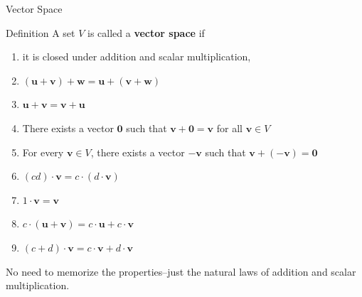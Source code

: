 \documentclass{beamer}
\begin{document}
\begin{frame}{Vector Space}
  \begin{block}{Definition}
    A set $V$ is called a \textbf{vector space} if
    \begin{enumerate}
    \item it is closed under addition and scalar multiplication,
      \item \( (\mathbf{u} + \mathbf{v}) + \mathbf{w} = \mathbf{u} + (\mathbf{v} + \mathbf{w}) \)
      \item \( \mathbf{u} + \mathbf{v} = \mathbf{v} + \mathbf{u} \)
      \item There exists a vector \( \mathbf{0} \) such that \( \mathbf{v} + \mathbf{0} = \mathbf{v} \) for all \( \mathbf{v} \in V \)
      \item For every \( \mathbf{v} \in V \), there exists a vector \( -\mathbf{v} \) such that \( \mathbf{v} + (-\mathbf{v}) = \mathbf{0} \)
      \item \( (cd) \cdot \mathbf{v} = c \cdot (d \cdot \mathbf{v}) \)
      \item \( 1 \cdot \mathbf{v} = \mathbf{v} \)
      \item \( c \cdot (\mathbf{u} + \mathbf{v}) = c \cdot \mathbf{u} + c \cdot \mathbf{v} \)
      \item \( (c + d) \cdot \mathbf{v} = c \cdot \mathbf{v} + d \cdot \mathbf{v} \)
    \end{enumerate}
  \end{block}
    
  No need to memorize the properties--just the natural laws of addition and scalar multiplication. 
\end{frame}




\end{document}
